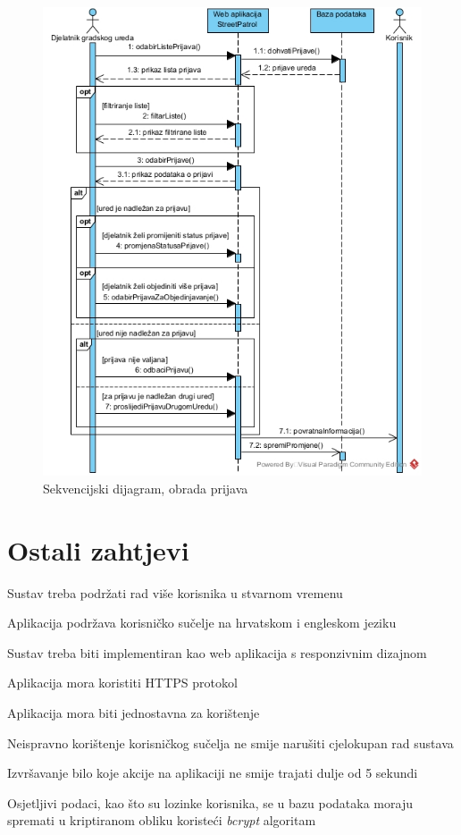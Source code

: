 				\begin{figure}[H]
					\includegraphics[width=\textwidth]{slike/Obrada_prijavaSD.jpg} %
					\caption{Sekvencijski dijagram, obrada prijava}
					\label{fig:sekvencijskiDijagram3} %
				\end{figure}
				\eject


	
		\section{Ostali zahtjevi}
			
			\begin{packed_item}
				\item Sustav treba podržati rad više korisnika u stvarnom vremenu
				\item Aplikacija podržava korisničko sučelje na hrvatskom i engleskom jeziku
				\item Sustav treba biti implementiran kao web aplikacija s responzivnim dizajnom
				\item Aplikacija mora koristiti HTTPS protokol
				\item Aplikacija mora biti jednostavna za korištenje
				\item Neispravno korištenje korisničkog sučelja ne smije narušiti cjelokupan rad sustava
				\item Izvršavanje bilo koje akcije na aplikaciji ne smije trajati dulje od 5 sekundi
				\item Osjetljivi podaci, kao što su lozinke korisnika, se u bazu podataka moraju spremati u kriptiranom obliku koristeći \textit{bcrypt} algoritam
			\end{packed_item}
			